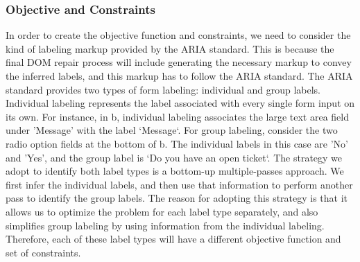 \subsubsection{Objective and Constraints}\label{subsec:obj}
In order to create the objective function and constraints, we need to 
consider the kind of labeling markup provided by the ARIA 
standard. This is because the final DOM repair process will include 
generating the necessary markup to convey the inferred labels, and 
this markup has to follow the ARIA standard. The ARIA standard provides 
two types of form labeling: individual and group labels. Individual 
labeling represents the label associated with every single form input 
on its own. For instance, in b, individual 
labeling associates the large text area field under 'Message' with the 
label `Message`. For group labeling, consider the two radio option 
fields at the bottom of b. The individual 
labels in this case are 'No' and 'Yes', and the group label is `Do 
you have an open ticket`. The strategy we adopt to identify both label 
types is a bottom-up multiple-passes approach. We first infer the 
individual labels, and then use that information to perform another 
pass to identify the group labels. The reason for adopting this 
strategy is that it allows us to optimize the problem for each 
label type separately, and also simplifies group labeling by using 
information from the individual labeling. Therefore, each of these 
label types will have a different objective function and set of constraints. 

